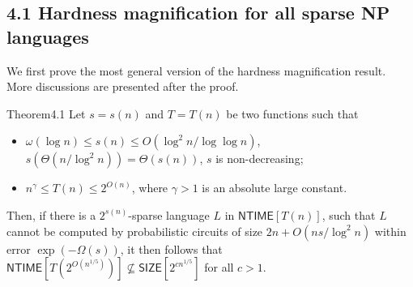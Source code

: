 \subsection*{4.1 Hardness magnification for all sparse NP languages}
We first prove the most general version of the hardness magnification result. More discussions are presented after the proof.
\begin{authorclaim}{Theorem4.1}
Let $s=s(n)$ and $T=T(n)$ be two functions such that
\begin{itemize}
\item $\omega(\log n)\le s(n)\le O(\log^2n/\log\log n)$, $s(\Theta(n/\log^2n))=\Theta(s(n))$, $s$ is non-decreasing;
\item $n^\gamma\le T(n)\le2^{O(n)}$, where $\gamma>1$ is an absolute large constant.
\end{itemize}
Then, if there is a $2^{s(n)}$-sparse language $L$ in $\mathsf{NTIME}[T(n)]$, such that $L$ cannot be computed by probabilistic circuits of size $2n+O(ns/\log^2n)$ within error $\exp(-\Omega(s))$, it then follows that $\mathsf{NTIME}[T(2^{O(n^{1/5})})]\not\subseteq\mathsf{SIZE}[2^{cn^{1/5}}]$ for all $c>1$.
\end{authorclaim}
